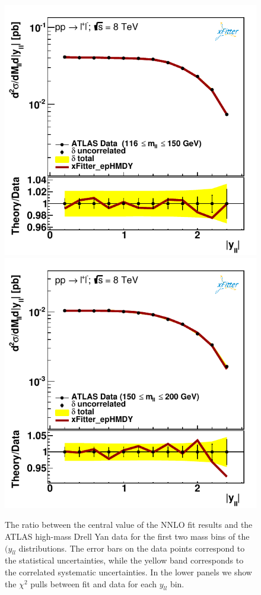 \begin{figure}[t]
\centering
\includegraphics[width=16cm]{figs/data_401-1.pdf}\\
\includegraphics[width=16cm]{figs/data_402-1.pdf}
\caption{The ratio between the central value of the NNLO fit results
  and the ATLAS high-mass Drell Yan data
  for the first two mass bins of the $(y_{ll}$ distributions.
  The error bars on the data points correspond to the statistical
  uncertainties, while the yellow band
  corresponds to the correlated systematic uncertainties.
  In the lower panels we show the $\chi^2$ pulls between fit and data for each $y_{ll}$
  bin.
}
\label{hmDY_2D_1}
\end{figure}


